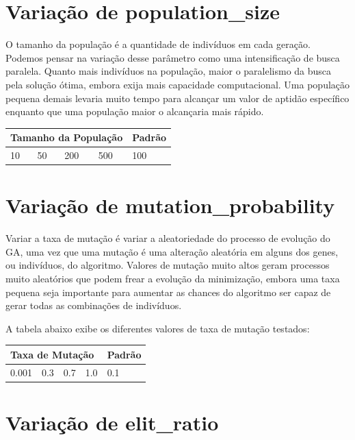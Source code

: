 \documentclass[12pt]{article}
\begin{document}
\section{Variação de population\_size}

O tamanho da população é a quantidade de indivíduos em cada geração. Podemos pensar na variação desse parâmetro como uma intensificação de busca paralela. Quanto mais indivíduos na população, maior o paralelismo da busca pela solução ótima, embora exija mais capacidade computacional. Uma população pequena demais levaria muito tempo para alcançar um valor de aptidão específico enquanto que uma população maior o alcançaria mais rápido.

\begin{table}[H]
	\centering
	\begin{tabular}{|l|l|l|l|l|}
		\hline
		\multicolumn{4}{|l|}{Tamanho da População}& Padrão \\ \hline
		10   & 50    & 200    & 500   & 100 \\ \hline
	\end{tabular}
\end{table}

\section{Variação de mutation\_probability}

Variar a taxa de mutação é variar a aleatoriedade do processo de evolução do GA, uma vez que uma mutação é uma alteração aleatória em alguns dos genes, ou indivíduos, do algoritmo. Valores de mutação muito altos geram processos muito aleatórios que podem frear a evolução da minimização, embora uma taxa pequena seja importante para aumentar as chances do algoritmo ser capaz de gerar todas as combinações de indivíduos.

A tabela abaixo exibe os diferentes valores de taxa de mutação testados:

\begin{table}[H]
	\centering
	\begin{tabular}{|l|l|l|l|l|}
		\hline
		\multicolumn{4}{|l|}{Taxa de Mutação} & Padrão \\ \hline
		0.001    & 0.3    & 0.7    & 1.0    & 0.1    \\ \hline
	\end{tabular}
\end{table}

\section{Variação de elit\_ratio}
\end{document}
